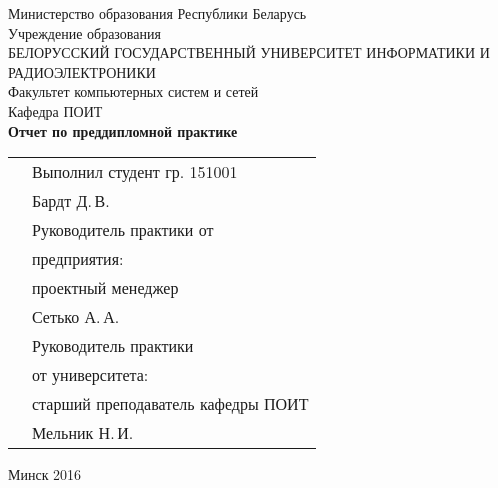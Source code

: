 \begin{titlepage}
    
    \begin{center}
        Министерство образования Республики Беларусь \\[0.4cm] 

        Учреждение образования \\

        \MakeUppercase{БЕЛОРУССКИЙ ГОСУДАРСТВЕННЫЙ УНИВЕРСИТЕТ ИНФОРМАТИКИ И РАДИОЭЛЕКТРОНИКИ} \\[0.4cm]

        Факультет компьютерных систем и сетей \\[0.4cm]

        Кафедра ПОИТ \\[3.4cm] %

        {\large\bfseries{Отчет по преддипломной практике}} \\[2cm]

        \noindent
        \begin{tabular}{p{}p{}}
            & Выполнил студент гр. 151001 \\
            & Бардт Д.\,В. \\[1cm]

            & Руководитель практики от \\
            & предприятия: \\
            & проектный менеджер \\
            & Сетько А.\,А. \\[1cm]

            & Руководитель практики \\
            & от университета: \\
            & старший преподаватель кафедры ПОИТ \\
            & Мельник Н.\,И. \\
        \end{tabular}

        \vfill

        {\normalsize Минск 2016}
    \end{center}

\end{titlepage}

